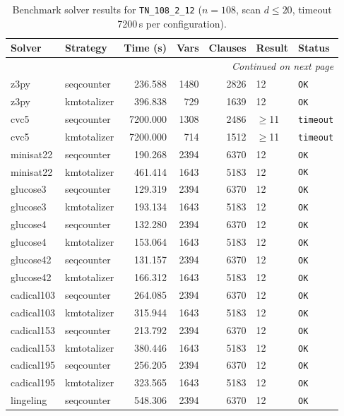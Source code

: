 \begin{longtable}{llrrrl p{}}
\caption{Benchmark solver results for \texttt{TN\_108\_2\_12} ($n=108$, scan $d \leq 20$, timeout 7200\,s per configuration).} \label{tab:bench-TN_108_2_12} \\
\toprule
Solver & Strategy & Time (s) & Vars & Clauses & Result & Status \\
\midrule
\endhead
\midrule
\multicolumn{7}{r}{\textit{Continued on next page}} \\
\midrule
\endfoot
\bottomrule
\endlastfoot
z3py & seqcounter & 236.588 & 1480 & 2826 & 12 & \texttt{OK} \\
z3py & kmtotalizer & 396.838 & 729 & 1639 & 12 & \texttt{OK} \\
cvc5 & seqcounter & 7200.000 & 1308 & 2486 & $\geq$11 & \texttt{timeout} \\
cvc5 & kmtotalizer & 7200.000 & 714 & 1512 & $\geq$11 & \texttt{timeout} \\
minisat22 & seqcounter & 190.268 & 2394 & 6370 & 12 & \texttt{OK} \\
minisat22 & kmtotalizer & 461.414 & 1643 & 5183 & 12 & \texttt{OK} \\
glucose3 & seqcounter & 129.319 & 2394 & 6370 & 12 & \texttt{OK} \\
glucose3 & kmtotalizer & 193.134 & 1643 & 5183 & 12 & \texttt{OK} \\
glucose4 & seqcounter & 132.280 & 2394 & 6370 & 12 & \texttt{OK} \\
glucose4 & kmtotalizer & 153.064 & 1643 & 5183 & 12 & \texttt{OK} \\
glucose42 & seqcounter & 131.157 & 2394 & 6370 & 12 & \texttt{OK} \\
glucose42 & kmtotalizer & 166.312 & 1643 & 5183 & 12 & \texttt{OK} \\
cadical103 & seqcounter & 264.085 & 2394 & 6370 & 12 & \texttt{OK} \\
cadical103 & kmtotalizer & 315.944 & 1643 & 5183 & 12 & \texttt{OK} \\
cadical153 & seqcounter & 213.792 & 2394 & 6370 & 12 & \texttt{OK} \\
cadical153 & kmtotalizer & 380.446 & 1643 & 5183 & 12 & \texttt{OK} \\
cadical195 & seqcounter & 256.205 & 2394 & 6370 & 12 & \texttt{OK} \\
cadical195 & kmtotalizer & 323.565 & 1643 & 5183 & 12 & \texttt{OK} \\
lingeling & seqcounter & 548.306 & 2394 & 6370 & 12 & \texttt{OK} \\

\end{longtable}
